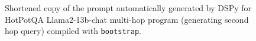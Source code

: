 {\begin{figure}[p]
\begin{center}
\begin{tabular}{|rp{\pWidth}|}
&\\\hline\end{tabular}
\caption{Shortened copy of the prompt automatically generated by DSPy for HotPotQA Llama2-13b-chat multi-hop program (generating second hop query) compiled with \texttt{bootstrap}.}
\label{fig:gms8k_hotpot_bootstrap}
\end{center}
\end{figure}

} %

